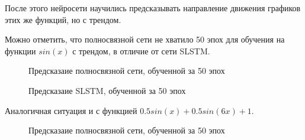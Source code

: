 \documentclass[a4paper,fontsize=12pt,titlepage,final]{scrartcl}
\begin{document}
После этого нейросети научились предсказывать направление движения графиков этих же функций, но с трендом. 

Можно отметить, что полносвязной сети не хватило 50 эпох для обучения на функции $sin(x)$ с трендом, в отличие от сети SLSTM. 

\begin{figure}[!h]
\caption{Предсказаие полносвязной сети, обученной за 50 эпох}\label{ris:sinx_trend}
\end{figure}

\begin{figure}[!h]
\caption{Предсказаие SLSTM, обученной за 50 эпох}\label{ris:sinx_trend}
\end{figure}

Аналогичная ситуация и с функцией $0.5sin(x) + 0.5sin(6x) + 1$.

\begin{figure}[!h]
\caption{Предсказаие полносвязной сети, обученной за 50 эпох}\label{ris:sin3x_trend}
\end{figure}
\end{document}
